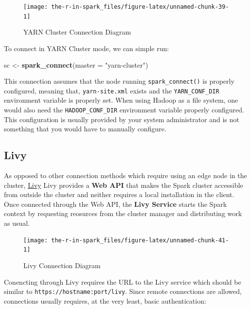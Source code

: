 \documentclass[]{book}
\newenvironment{Shaded}{\begin{snugshade}}{\end{snugshade}}
\newcommand{\DataTypeTok}[1]{\textcolor[rgb]{0.13,0.29,0.53}{#1}}
\newcommand{\KeywordTok}[1]{\textcolor[rgb]{0.13,0.29,0.53}{\textbf{#1}}}
\newcommand{\NormalTok}[1]{#1}
\newcommand{\StringTok}[1]{\textcolor[rgb]{0.31,0.60,0.02}{#1}}
\theoremstyle{definition}
\theoremstyle{definition}
\theoremstyle{definition}
\theoremstyle{remark}
\begin{document}
\begin{figure}

{\centering \texttt{[image: the-r-in-spark\_files/figure-latex/unnamed-chunk-39-1]} 

}

\caption{YARN Cluster Connection Diagram}\label{fig:unnamed-chunk-39}
\end{figure}

To connect in YARN Cluster mode, we can simple run:

\begin{Shaded}
\begin{Highlighting}[]
\NormalTok{sc <-}\StringTok{ }\KeywordTok{spark_connect}\NormalTok{(}\DataTypeTok{master =} \StringTok{"yarn-cluster"}\NormalTok{)}
\end{Highlighting}
\end{Shaded}

This connection assumes that the node running \texttt{spark\_connect()}
is properly configured, meaning that, \texttt{yarn-site.xml} exists and
the \texttt{YARN\_CONF\_DIR} environment variable is properly set. When
using Hadoop as a file system, one would also need the
\texttt{HADOOP\_CONF\_DIR} environment variable properly configured.
This configuration is usually provided by your system administrator and
is not something that you would have to manually configure.

\hypertarget{livy}{%
\subsection{Livy}\label{livy}}

As opposed to other connection methods which require using an edge node
in the cluster, \href{clusters-livy}{Livy} Livy provides a \textbf{Web
API} that makes the Spark cluster accessible from outside the cluster
and neither requires a local installation in the client. Once connected
through the Web API, the \textbf{Livy Service} starts the Spark context
by requesting reosurces from the cluster manager and distributing work
as usual.

\begin{figure}

{\centering \texttt{[image: the-r-in-spark\_files/figure-latex/unnamed-chunk-41-1]} 

}

\caption{Livy Connection Diagram}\label{fig:unnamed-chunk-41}
\end{figure}

Conencting through Livy requires the URL to the Livy service which
should be similar to \texttt{https://hostname:port/livy}. Since remote
connections are allowed, connections usually requires, at the very
least, basic authentication:
\end{document}
